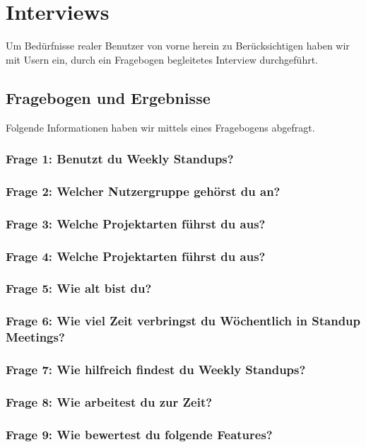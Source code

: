 \chapter{Interviews}

Um Bedürfnisse realer Benutzer von vorne herein zu Berücksichtigen haben wir mit Usern ein, durch ein Fragebogen begleitetes Interview durchgeführt.

\section{Fragebogen und Ergebnisse}

Folgende Informationen haben wir mittels eines Fragebogens abgefragt.

\subsection{Frage 1: Benutzt du Weekly Standups?}
\subsection{Frage 2: Welcher Nutzergruppe gehörst du an?}
\subsection{Frage 3: Welche Projektarten führst du aus?}
\subsection{Frage 4: Welche Projektarten führst du aus?}
\subsection{Frage 5: Wie alt bist du?}      
\subsection{Frage 6: Wie viel Zeit verbringst du Wöchentlich in Standup Meetings?}
\subsection{Frage 7: Wie hilfreich findest du Weekly Standups?}
\subsection{Frage 8: Wie arbeitest du zur Zeit?}
\subsection{Frage 9: Wie bewertest du folgende Features?}
